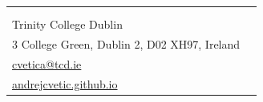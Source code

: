 \documentclass[10pt, a4paper]{article}
\makeatletter
\newcommand{\cvheader}[3][]{%
  \noindent
  \begin{tabular*}{\textwidth}{@{}l@{\extracolsep{\fill}}r@{}}
    {%
      \ifstrempty{#1}{%
        {\fontsize{17.2}{20}\selectfont\bfseries #2}%
      }{%
        \begin{tabular}[t]{@{}l@{\hspace{0.22em}}r@{}}
          {\fontsize{17.2}{20}\selectfont\bfseries #2} &
          {\hypersetup{urlcolor=orcidgreen}%
           \href{https://orcid.org/#1}{%
             \raisebox{1.3ex}{\fontsize{7.25}{8}\selectfont\faOrcid}%
           }%
          } \\
        \end{tabular}%
      }%
    } &
    {\fontsize{8}{10}\selectfont
    \begin{tabular}[b]{@{}r@{}}
      #3
    \end{tabular}}
  \end{tabular*}%
  \vspace{4pt}%
}
\makeatother
\begin{document}
\cvheader[0000-0002-6668-0171]{Andrej Cvetić}{%
  Department of Political Science \\
  Trinity College Dublin \\
  3 College Green, Dublin 2, D02 XH97, Ireland \\
  \href{mailto:cvetica@tcd.ie}{cvetica@tcd.ie} \\
  \href{https://andrejcvetic.github.io}{andrejcvetic.github.io}%
}

\nocite{%
  cvetic2022bourdieu,cvetic2021rsc,cvetic2016asexuality,cvetic2016asexualitysr,%
  cvetic2020reviewkhalil,cvetic2019reviewmalesevic,%
  cveticwipdiscrimination,cveticwipautocratic,cveticwiphandbook,cveticwiptrust,%
  cveticwipimmigrantsattrs,cveticwipradicalhealth,cveticwipsystemtrust,%
  cveticwipsuicide,%
}
\end{document}
